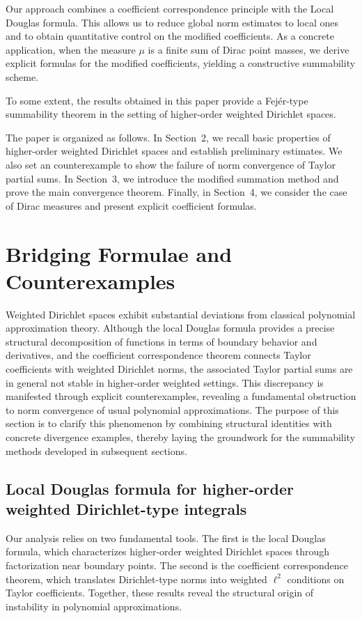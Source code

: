 \documentclass[12pt,reqno]{amsart}
\begin{document}
Our approach combines a coefficient correspondence principle with the Local Douglas formula.
This allows us to reduce global norm estimates to local ones and to obtain quantitative control on the modified coefficients.
As a concrete application, when the measure $\mu$ is a finite sum of Dirac point masses, we derive explicit formulas for the modified coefficients, yielding a constructive summability scheme.

To some extent, the results obtained in this paper provide a Fej\'er-type summability theorem in the setting of higher-order weighted Dirichlet spaces.

The paper is organized as follows. In Section~2, we recall basic properties of higher-order weighted Dirichlet spaces and establish preliminary estimates.
We also set an counterexample to show the failure of norm convergence of Taylor partial sums.
In Section~3, we introduce the modified summation method and prove the main convergence theorem.
Finally, in Section~4, we consider the case of Dirac measures and present explicit coefficient formulas.

\section{Bridging Formulae and Counterexamples}

Weighted Dirichlet spaces exhibit substantial deviations from classical polynomial approximation theory. Although the local Douglas formula provides a precise structural decomposition of functions in terms of boundary behavior and derivatives, and the coefficient correspondence theorem connects Taylor coefficients with weighted Dirichlet norms, the associated Taylor partial sums are in general not stable in higher-order weighted settings. This discrepancy is manifested through explicit counterexamples, revealing a fundamental obstruction to norm convergence of usual polynomial approximations. The purpose of this section is to clarify this phenomenon by combining structural identities with concrete divergence examples, thereby laying the groundwork for the summability methods developed in subsequent sections.

\subsection{Local Douglas formula for higher-order weighted Dirichlet-type integrals}

Our analysis relies on two fundamental tools.
The first is the local Douglas formula, which characterizes higher-order weighted Dirichlet spaces through factorization near boundary points.
The second is the coefficient correspondence theorem, which translates Dirichlet-type norms into weighted $\ell^2$ conditions on Taylor coefficients.
Together, these results reveal the structural origin of instability in polynomial approximations.
\end{document}
